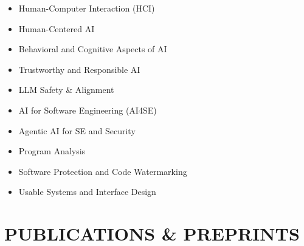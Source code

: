 \documentclass[letterpaper,11pt]{article}
\begin{document}
\noindent
\begin{minipage}[t]{0.48\textwidth}
\begin{itemize}[leftmargin=*, itemsep=1pt, topsep=1pt, parsep=0pt, partopsep=0pt]
    \item Human-Computer Interaction (HCI)
    \item Human-Centered AI
    \item Behavioral and Cognitive Aspects of AI
    \item Trustworthy and Responsible AI
    \item LLM Safety \& Alignment
\end{itemize}
\end{minipage}
\hfill
\begin{minipage}[t]{0.48\textwidth}
\begin{itemize}[leftmargin=*, itemsep=1pt, topsep=1pt, parsep=0pt, partopsep=0pt]
    \item AI for Software Engineering (AI4SE)
    \item Agentic AI for SE and Security
    \item Program Analysis
    \item Software Protection and Code Watermarking
    \item Usable Systems and Interface Design
    
\end{itemize}
\end{minipage}

\section{PUBLICATIONS \& PREPRINTS}
\end{document}
